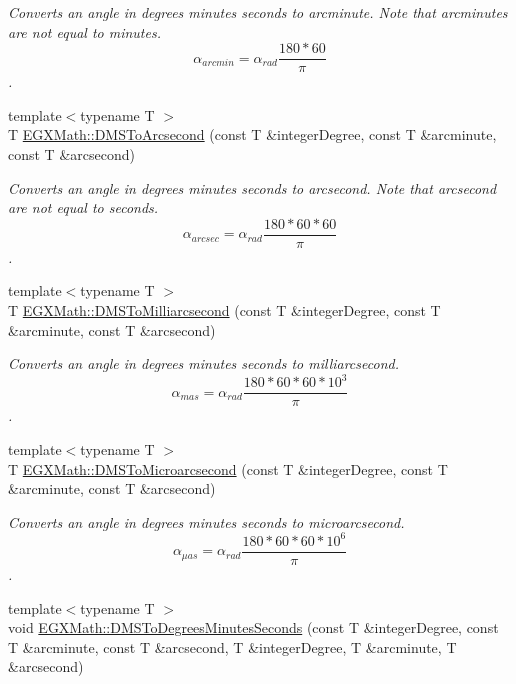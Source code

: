 \begin{DoxyCompactItemize}
\begin{DoxyCompactList}\small\item\em Converts an angle in degrees minutes seconds to arcminute. Note that arcminutes are not equal to minutes. \[\alpha_{arcmin}=\alpha_{rad}\frac{180 * 60}{\pi}\]. \end{DoxyCompactList}\item 
{\footnotesize template$<$typename T $>$ }\\T \mbox{\hyperlink{group___e_g_x_math-_angle_conversions-_d_m_s_gac9d0871ac2dd889cf9f3c00d25f8a013}{E\+G\+X\+Math\+::\+D\+M\+S\+To\+Arcsecond}} (const T \&integer\+Degree, const T \&arcminute, const T \&arcsecond)
\begin{DoxyCompactList}\small\item\em Converts an angle in degrees minutes seconds to arcsecond. Note that arcsecond are not equal to seconds. \[\alpha_{arcsec}=\alpha_{rad}\frac{180 * 60 * 60}{\pi}\]. \end{DoxyCompactList}\item 
{\footnotesize template$<$typename T $>$ }\\T \mbox{\hyperlink{group___e_g_x_math-_angle_conversions-_d_m_s_ga35a14699b2497a473f6a742ea2901557}{E\+G\+X\+Math\+::\+D\+M\+S\+To\+Milliarcsecond}} (const T \&integer\+Degree, const T \&arcminute, const T \&arcsecond)
\begin{DoxyCompactList}\small\item\em Converts an angle in degrees minutes seconds to milliarcsecond. \[\alpha_{mas}=\alpha_{rad}\frac{180 * 60 * 60 * 10^3}{\pi}\]. \end{DoxyCompactList}\item 
{\footnotesize template$<$typename T $>$ }\\T \mbox{\hyperlink{group___e_g_x_math-_angle_conversions-_d_m_s_ga1230f4c81771a59d9973beb0e6747dbf}{E\+G\+X\+Math\+::\+D\+M\+S\+To\+Microarcsecond}} (const T \&integer\+Degree, const T \&arcminute, const T \&arcsecond)
\begin{DoxyCompactList}\small\item\em Converts an angle in degrees minutes seconds to microarcsecond. \[\alpha_{\mu as}=\alpha_{rad}\frac{180 * 60 * 60 * 10^6}{\pi}\]. \end{DoxyCompactList}\item 
{\footnotesize template$<$typename T $>$ }\\void \mbox{\hyperlink{group___e_g_x_math-_angle_conversions-_d_m_s_gaf71b42823b38454ad66668f086d46bdc}{E\+G\+X\+Math\+::\+D\+M\+S\+To\+Degrees\+Minutes\+Seconds}} (const T \&integer\+Degree, const T \&arcminute, const T \&arcsecond, T \&integer\+Degree, T \&arcminute, T \&arcsecond)

\end{DoxyCompactItemize}
